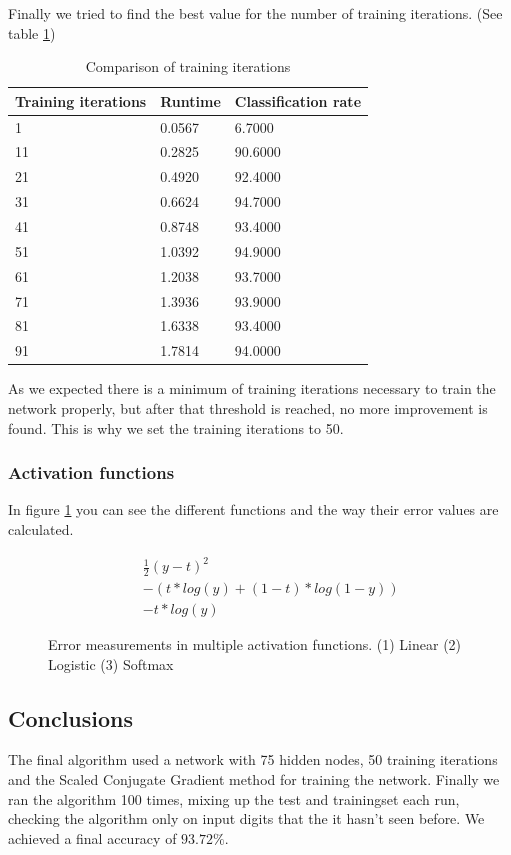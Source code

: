 \documentclass{article}
\begin{document}
\newpage
Finally we tried to find the best value for the number of training iterations. (See table \ref{tab:trainiter})
\begin{table}[H]
	\centering
	\begin{tabular}{| l | l | l |}
		\hline
		Training iterations & Runtime & Classification rate \\ \hline
            1 &   0.0567  &  6.7000 \\ \hline
           11 &   0.2825  & 90.6000 \\ \hline
           21 &   0.4920  & 92.4000 \\ \hline
           31 &   0.6624  & 94.7000 \\ \hline
           41 &   0.8748  & 93.4000 \\ \hline
           51 &   1.0392  & 94.9000 \\ \hline
           61 &   1.2038  & 93.7000 \\ \hline
           71 &   1.3936  & 93.9000 \\ \hline
           81 &   1.6338  & 93.4000 \\ \hline
           91 &   1.7814  & 94.0000 \\ \hline
	\end{tabular}
	\caption{Comparison of training iterations}
	\label{tab:trainiter}
\end{table}

As we expected there is a minimum of training iterations necessary to train the network properly, but after that threshold is reached, no more improvement is found. This is why we set the training iterations to 50.

\subsubsection{Activation functions}
In figure \ref{fig:errormeasure} you can see the different functions and the way their error values are calculated.

\begin{figure}[H]
	\centering
	\begin{eqnarray}
		&& \frac{1}{2}(y - t)^2 \\
		&&-(t * log(y) + (1 - t) * log(1 - y)) \\
		&& -t * log(y)
	\end{eqnarray}
	\caption{Error measurements in multiple activation functions. (1) Linear (2) Logistic (3) Softmax }
    \label{fig:errormeasure}
\end{figure}

\subsection{Conclusions}
The final algorithm used a network with 75 hidden nodes, 50 training iterations and the Scaled Conjugate Gradient method for training the network. Finally we ran the algorithm 100 times, mixing up the test and trainingset each run, checking the algorithm only on input digits that the it hasn't seen before. We achieved a final accuracy of $93.72\%$.
\end{document}

